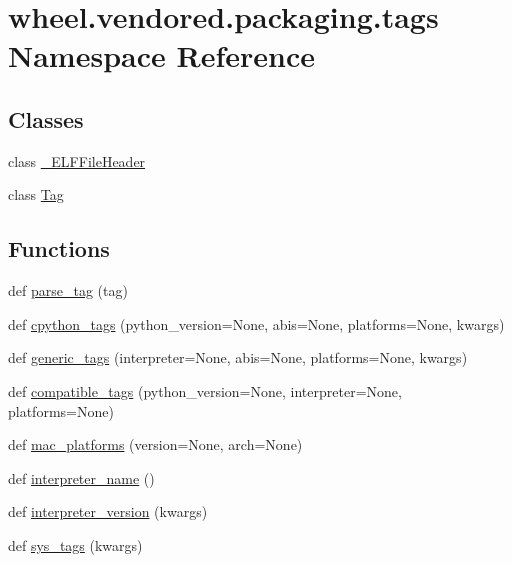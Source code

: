 \hypertarget{namespacewheel_1_1vendored_1_1packaging_1_1tags}{}\section{wheel.\+vendored.\+packaging.\+tags Namespace Reference}
\label{namespacewheel_1_1vendored_1_1packaging_1_1tags}
\subsection*{Classes}
\begin{DoxyCompactItemize}
\item 
class \hyperlink{classwheel_1_1vendored_1_1packaging_1_1tags_1_1__ELFFileHeader}{\+\_\+\+E\+L\+F\+File\+Header}
\item 
class \hyperlink{classwheel_1_1vendored_1_1packaging_1_1tags_1_1Tag}{Tag}
\end{DoxyCompactItemize}
\subsection*{Functions}
\begin{DoxyCompactItemize}
\item 
def \hyperlink{namespacewheel_1_1vendored_1_1packaging_1_1tags_adad8fe5985f2db710719817409806d4e}{parse\+\_\+tag} (tag)
\item 
def \hyperlink{namespacewheel_1_1vendored_1_1packaging_1_1tags_aae023c374ad7825b9d3f943d9e36b169}{cpython\+\_\+tags} (python\+\_\+version=None, abis=None, platforms=None, kwargs)
\item 
def \hyperlink{namespacewheel_1_1vendored_1_1packaging_1_1tags_a199ba251a0877076b8007baffffed1a2}{generic\+\_\+tags} (interpreter=None, abis=None, platforms=None, kwargs)
\item 
def \hyperlink{namespacewheel_1_1vendored_1_1packaging_1_1tags_aace61eef4bc25ac7347c068de81df95d}{compatible\+\_\+tags} (python\+\_\+version=None, interpreter=None, platforms=None)
\item 
def \hyperlink{namespacewheel_1_1vendored_1_1packaging_1_1tags_a7a425b4ec7e87900a12436639b659621}{mac\+\_\+platforms} (version=None, arch=None)
\item 
def \hyperlink{namespacewheel_1_1vendored_1_1packaging_1_1tags_aeb0ded3973cb6f890ce2f924c58e72ec}{interpreter\+\_\+name} ()
\item 
def \hyperlink{namespacewheel_1_1vendored_1_1packaging_1_1tags_a61301b2e3c1f29c718bba218a5956c59}{interpreter\+\_\+version} (kwargs)
\item 
def \hyperlink{namespacewheel_1_1vendored_1_1packaging_1_1tags_a08f919d05b93256070a44ce8107250a1}{sys\+\_\+tags} (kwargs)
\end{DoxyCompactItemize}
